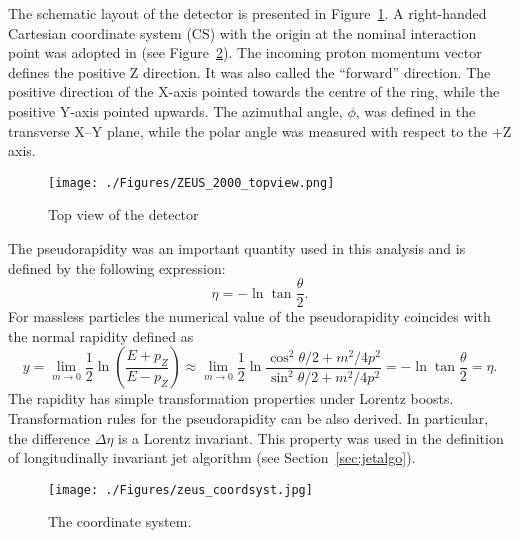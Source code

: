 The schematic layout of the \zeus detector is presented in Figure~\ref{fig:zeus2d1}. A right-handed Cartesian coordinate system (CS) with the origin at the nominal interaction point was adopted in \zeus (see Figure~\ref{fig:zeus_coordsyst}). The incoming proton momentum vector defines the positive Z direction. It was also called the ``forward'' direction. The positive direction of the X-axis pointed towards the centre of the \hera ring, while the positive Y-axis pointed upwards. The azimuthal angle, $\phi$, was defined in the transverse X--Y plane, while the polar angle was measured with respect to the +Z axis. 
\begin{landscape}
\begin{figure}[htpb]
	\centering
		\texttt{[image: ./Figures/ZEUS\_2000\_topview.png]}
	\caption{Top view of the \zeus detector}
	\label{fig:zeus2d1}
\end{figure}
\end{landscape}

The pseudorapidity was an important quantity used in this analysis and is defined by the following expression:
\begin{equation}
\eta = -\ln \tan \dfrac{\theta}{2}.
\label{eq:pseudorapidity}
\end{equation}
For massless particles the numerical value of the pseudorapidity coincides with the normal rapidity defined as 
\begin{equation}
y=\lim_{m\rightarrow 0}\frac{1}{2}\ln{\left(\frac{E+p_Z}{E-p_Z}\right)}\approx \lim_{m\rightarrow 0}\frac{1}{2}\ln{\frac{\cos^2{\theta/2}+m^2/4p^2}{\sin^2{\theta/2}+m^2/4p^2}} = -\ln \tan \dfrac{\theta}{2} = \eta.
\label{eq:rapidity}
\end{equation}
The rapidity has simple transformation properties under Lorentz boosts. Transformation rules for the pseudorapidity can be also derived. In particular, the difference $\Delta \eta$ is a Lorentz invariant. This property was used in the definition of longitudinally invariant jet algorithm (see Section~\ref{sec:jetalgo}). 
	
\begin{figure}[htpb]
	\centering
		\texttt{[image: ./Figures/zeus\_coordsyst.jpg]}
	\caption{The \zeus coordinate system.}
	\label{fig:zeus_coordsyst}
\end{figure}
